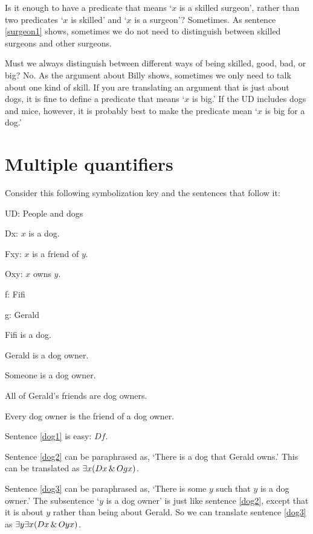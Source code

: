 Is it enough to have a predicate that means `$x$ is a skilled surgeon', rather than two predicates `$x$ is skilled' and `$x$ is a surgeon'? Sometimes. As sentence \ref{surgeon1} shows, sometimes we do not need to distinguish between skilled surgeons and other surgeons.

Must we always distinguish between different ways of being skilled, good, bad, or big? No. As the argument about Billy shows, sometimes we only need to talk about one kind of skill. If you are translating an argument that is just about dogs, it is fine to define a predicate that means `$x$ is big.' If the UD includes dogs and mice, however, it is probably best to make the predicate mean `$x$ is big for a dog.'


\section{Multiple quantifiers}
Consider this following symbolization key and the sentences that follow it:
\begin{ekey}
\item{UD:} People and dogs
\item{Dx:} $x$ is a dog.
\item{Fxy:} $x$ is a friend of $y$.
\item{Oxy:} $x$ owns $y$.
\item{f:} Fifi
\item{g:} Gerald
\end{ekey}

\begin{earg}
\item[\ex{dog1}] Fifi is a dog.
\item[\ex{dog2}] Gerald is a dog owner.
\item[\ex{dog3}] Someone is a dog owner.
\item[\ex{dog4}] All of Gerald's friends are dog owners.
\item[\ex{dog5}] Every dog owner is the friend of a dog owner.
\end{earg}

Sentence \ref{dog1} is easy: $Df$.

Sentence \ref{dog2} can be paraphrased as, `There is a dog that Gerald owns.' This can be translated as $\exists x(Dx \,\&\, Ogx)$.

Sentence \ref{dog3} can be paraphrased as, `There is some $y$ such that $y$ is a dog owner.' The subsentence `$y$ is a dog owner' is just like sentence \ref{dog2}, except that it is about $y$ rather than being about Gerald. So we can translate sentence \ref{dog3} as $\exists y \exists x(Dx \,\&\, Oyx)$. 

